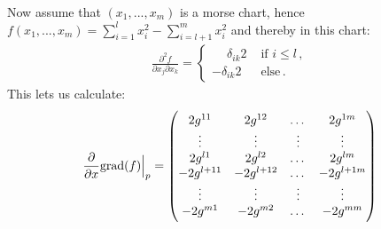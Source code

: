 Now assume that $(x_1,...,x_m)$ is a morse chart, hence $f(x_1,...,x_m)=\sum_{i=1}^lx_i^2-\sum_{i=l+1}^mx_i^2$ and thereby in this chart:
\begin{align}
    \frac{\partial ^2 f }{\partial x_j \partial x_k}= \begin{cases}
        \phantom{-} \delta_{ik}2& \text{ if } i\leq l \, , \\
        -\delta_{ik}2& \text{ else} \, .
    \end{cases}
\end{align} This lets us calculate: 
\begin{align*}
    \frac{\partial}{\partial x}\mathrm{grad}(f)\Big|_p=\begin{pmatrix}
        2 g^{11}  &  2g^{12}&   \dots   &  2g^{1m}\\
        \vdots    & \vdots  & \vdots    & \vdots \\
        2 g^{l1}  &  2g^{l2}&   \dots   &  2g^{lm}\\
        - 2 g^{l+11} &  -2g^{l+12}&   \dots   &  -2g^{l+1m}\\
                \vdots    & \vdots  & \vdots    & \vdots \\
      - 2 g^{m1} &  -2g^{m2}&   \dots   &  -2g^{mm}\\
    \end{pmatrix}
\end{align*}


